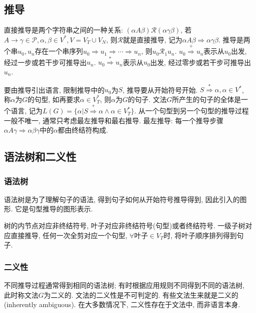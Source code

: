     \subsection{推导}

        \textsf{直接推导}是两个字符串之间的一种关系: $(\alpha A\beta)\mathcal{R}(\alpha\gamma\beta)$, 若$A\to\gamma\in\mathcal{P}, \alpha, \beta\in V^*, V=V_T\cup V_N$, 则$\mathcal{R}$就是直接推导, 记为$\alpha A\beta\Rightarrow\alpha\gamma\beta$. \textsf{推导}是两个串$u_0, u_n$存在一个串序列$u_0\Rightarrow u_1\Rightarrow \cdots\Rightarrow u_n$, 则$u_0\mathcal{R}_1u_n$. $u_0\stackrel{+}{\Rightarrow}u_n$表示从$u_0$出发, 经过一步或若干步可推导出$u_n$. $u_0\stackrel{*}{\Rightarrow}u_n$表示从$u_0$出发, 经过零步或若干步可推导出$u_n$. 

        要由推导引出语言, 限制推导中的$u_0$为$S$, 推导要从开始符号开始. $S\stackrel{*}{\Rightarrow}\alpha, \alpha\in V^*$, 称$\alpha$为$G$的\textsf{句型}, 如再要求$\alpha\in V_T^*$, 则$\alpha$为$G$的\textsf{句子}. 文法$G$所产生的句子的全体是一个\textsf{语言}, 记为$L(G)=\{\alpha|S\stackrel{+}{\Rightarrow}\alpha\wedge \alpha\in V_T^*\}$. 从一个句型到另一个句型的推导过程一般不唯一, 通常只考虑最左推导和最右推导. \textsf{最左推导}: 每一个推导步骤$\alpha A\gamma\Rightarrow\alpha\beta\gamma$中的$\alpha$都由终结符构成.

    \subsection{语法树和二义性}

        \subsubsection{语法树}

            \textsf{语法树}是为了理解句子的语法, 得到句子如何从开始符号推导得到, 因此引入的图形. 它是句型推导的图形表示. 
            
            树的内节点对应非终结符号, 叶子对应非终结符号(句型)或者终结符号. 一级子树对应直接推导, 任何一次全剪对应一个句型, $\forall$叶子$\in V_T$时, 将叶子顺序排列得到句子.
            
        \subsubsection{二义性}

            不同推导过程通常得到相同的语法树; 有时根据应用规则不同得到不同的语法树, 此时称文法$G$为\textsf{二义的}. 文法的二义性是不可判定的. 有些文法生来就是二义的(inherently ambiguous). 在大多数情况下, 二义性存在于文法中, 而非语言本身.


